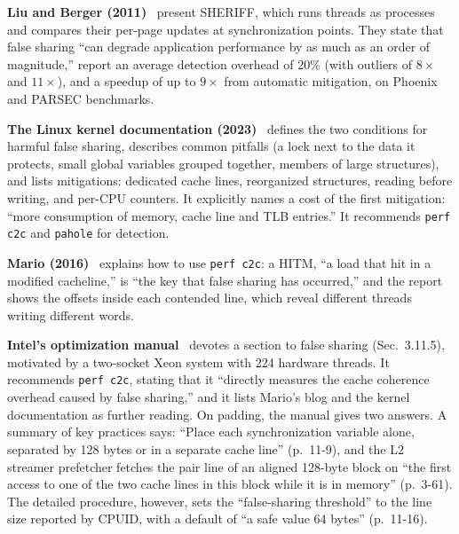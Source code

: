 \documentclass[journal]{IEEEtran}
\begin{document}
\textbf{Liu and Berger (2011)}~\cite{liu2011sheriff} present SHERIFF, which runs
threads as processes and compares their per-page updates at synchronization
points. They state that false sharing ``can degrade application performance by
as much as an order of magnitude,'' report an average detection overhead of
20\% (with outliers of $8\times$ and $11\times$), and a speedup of up to $9\times$
from automatic mitigation, on Phoenix and PARSEC benchmarks.

\textbf{The Linux kernel documentation (2023)}~\cite{tang2023kernel} defines
the two conditions for harmful false sharing, describes common pitfalls (a lock
next to the data it protects, small global variables grouped together, members
of large structures), and lists mitigations: dedicated cache lines, reorganized
structures, reading before writing, and per-CPU counters. It explicitly names a
cost of the first mitigation: ``more consumption of memory, cache line and TLB
entries.'' It recommends \texttt{perf c2c} and \texttt{pahole} for detection.

\textbf{Mario (2016)}~\cite{mario2016c2c} explains how to use \texttt{perf c2c}:
a HITM, ``a load that hit in a modified cacheline,'' is ``the key that false
sharing has occurred,'' and the report shows the offsets inside each contended
line, which reveal different threads writing different words.

\textbf{Intel's optimization manual}~\cite{intel2024opt} devotes a section to
false sharing (Sec.~3.11.5), motivated by a two-socket Xeon system with 224
hardware threads. It recommends \texttt{perf c2c}, stating that it ``directly
measures the cache coherence overhead caused by false sharing,'' and it lists
Mario's blog and the kernel documentation as further reading. On padding, the
manual gives two answers. A summary of key practices says: ``Place each
synchronization variable alone, separated by 128 bytes or in a separate cache
line'' (p.~11-9), and the L2 streamer prefetcher fetches the pair line of an
aligned 128-byte block on ``the first access to one of the two cache lines in
this block while it is in memory'' (p.~3-61). The detailed procedure, however,
sets the ``false-sharing threshold'' to the line size reported by CPUID, with
a default of ``a safe value 64 bytes'' (p.~11-16).
\end{document}
